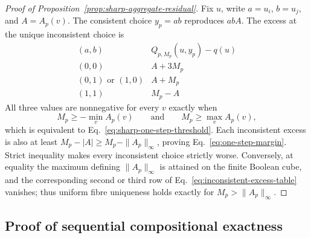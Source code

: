 \documentclass[a4paper,onecolumn,11pt,unpublished]{quantumarticle}
\theoremstyle{remark}
\begin{document}
\begin{proof}[Proof of Proposition~\ref{prop:sharp-aggregate-residual}]
Fix \(u\), write \(a=u_i\), \(b=u_j\), and \(A=A_p(v)\).  The consistent
choice \(y_p=ab\) reproduces \(abA\).  The excess at the unique inconsistent
choice is
\begin{equation}
\begin{array}{c|c}
 (a,b) & Q_{p,M_p}(u,y_p)-q(u) \\ \hline
 (0,0) & A+3M_p \\
 (0,1)\text{ or }(1,0) & A+M_p \\
 (1,1) & M_p-A
\end{array}
\label{eq:inconsistent-excess-table}
\end{equation}
All three values are nonnegative for every \(v\) exactly when
\begin{equation}
  M_p\geq-\min_vA_p(v)
  \qquad\text{and}\qquad
  M_p\geq\max_vA_p(v),
\end{equation}
which is equivalent to Eq.~\eqref{eq:sharp-one-step-threshold}.  Each
inconsistent excess is also at least
\(M_p-|A|\geq M_p-\|A_p\|_\infty\), proving
Eq.~\eqref{eq:one-step-margin}.  Strict inequality makes every inconsistent
choice strictly worse.  Conversely, at equality the maximum defining
\(\|A_p\|_\infty\) is attained on the finite Boolean cube, and the
corresponding second or third row of
Eq.~\eqref{eq:inconsistent-excess-table} vanishes; thus uniform fibre
uniqueness holds exactly for \(M_p>\|A_p\|_\infty\).
\end{proof}


\subsection{Proof of sequential compositional exactness}
\label{app:compositional-proof}
\end{document}
